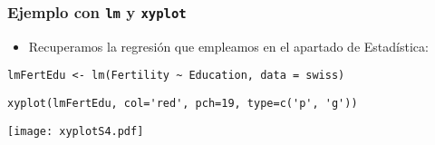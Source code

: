 \documentclass[xcolor={usenames,svgnames,dvipsnames}]{beamer}
\begin{document}
\begin{frame}[fragile]
\frametitle{Ejemplo con \texttt{lm} y \texttt{xyplot}}
\label{sec-3-3-2}

\begin{itemize}
\item Recuperamos la regresión que empleamos en el apartado de Estadística:
\end{itemize}

\lstset{language=R}
\begin{lstlisting}
lmFertEdu <- lm(Fertility ~ Education, data = swiss)
\end{lstlisting}



\lstset{language=R}
\begin{lstlisting}
xyplot(lmFertEdu, col='red', pch=19, type=c('p', 'g'))
\end{lstlisting}

\texttt{[image: xyplotS4.pdf]}
\end{frame}
\end{document}
